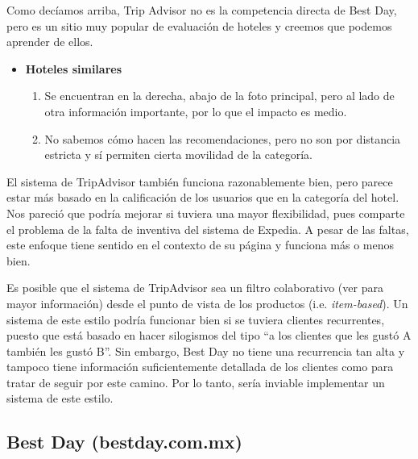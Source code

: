 \documentclass[12pt]{report}
\begin{document}
Como decíamos arriba, Trip Advisor no es la competencia directa de Best Day, pero es un sitio muy popular de evaluación de hoteles y creemos que podemos aprender de ellos.
\begin{itemize}
	\item \textbf{Hoteles similares}
	\begin{enumerate}
		\item Se encuentran en la derecha, abajo de la foto principal, pero al lado de otra información importante, por lo que el impacto es medio.
		\item No sabemos cómo hacen las recomendaciones, pero no son por distancia estricta y sí permiten cierta movilidad de la categoría.
	\end{enumerate}
\end{itemize}
El sistema de TripAdvisor también funciona razonablemente bien, pero parece estar más basado en la calificación de los usuarios que en la categoría del hotel. Nos pareció que podría mejorar si tuviera una mayor flexibilidad, pues comparte el problema de la falta de inventiva del sistema de Expedia. A pesar de las faltas, este enfoque tiene sentido en el contexto de su página y funciona más o menos bien.

Es posible que el sistema de TripAdvisor sea un filtro colaborativo (ver \cite{mmds} para mayor información) desde el punto de vista de los productos (i.e. \emph{item-based}). Un sistema de este estilo podría funcionar bien si se tuviera clientes recurrentes, puesto que está basado en hacer silogismos del tipo ``a los clientes que les gustó A también les gustó B''. Sin embargo, Best Day no tiene una recurrencia tan alta y tampoco tiene información suficientemente detallada de los clientes como para tratar de seguir por este camino. Por lo tanto, sería inviable implementar un sistema de este estilo.


\subsection*{Best Day (bestday.com.mx)}
\end{document}
